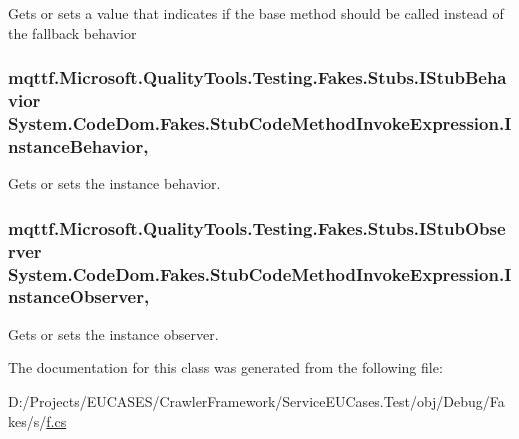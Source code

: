 Gets or sets a value that indicates if the base method should be called instead of the fallback behavior

\hypertarget{class_system_1_1_code_dom_1_1_fakes_1_1_stub_code_method_invoke_expression_a9badb6f29138e18f58863a361d3f5277}{
\subsubsection[{Instance\-Behavior}]{\setlength{\rightskip}{0pt plus 5cm}mqttf.\-Microsoft.\-Quality\-Tools.\-Testing.\-Fakes.\-Stubs.\-I\-Stub\-Behavior System.\-Code\-Dom.\-Fakes.\-Stub\-Code\-Method\-Invoke\-Expression.\-Instance\-Behavior\hspace{0.3cm}{\ttfamily [get]}, {\ttfamily [set]}}}\label{class_system_1_1_code_dom_1_1_fakes_1_1_stub_code_method_invoke_expression_a9badb6f29138e18f58863a361d3f5277}


Gets or sets the instance behavior.

\hypertarget{class_system_1_1_code_dom_1_1_fakes_1_1_stub_code_method_invoke_expression_a21fa18cf02868f53f65d2469f395eb7d}{
\subsubsection[{Instance\-Observer}]{\setlength{\rightskip}{0pt plus 5cm}mqttf.\-Microsoft.\-Quality\-Tools.\-Testing.\-Fakes.\-Stubs.\-I\-Stub\-Observer System.\-Code\-Dom.\-Fakes.\-Stub\-Code\-Method\-Invoke\-Expression.\-Instance\-Observer\hspace{0.3cm}{\ttfamily [get]}, {\ttfamily [set]}}}\label{class_system_1_1_code_dom_1_1_fakes_1_1_stub_code_method_invoke_expression_a21fa18cf02868f53f65d2469f395eb7d}


Gets or sets the instance observer.



The documentation for this class was generated from the following file\-:\begin{DoxyCompactItemize}
\item 
D\-:/\-Projects/\-E\-U\-C\-A\-S\-E\-S/\-Crawler\-Framework/\-Service\-E\-U\-Cases.\-Test/obj/\-Debug/\-Fakes/s/\hyperlink{s_2f_8cs}{f.\-cs}\end{DoxyCompactItemize}
